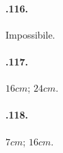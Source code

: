 \begin{multicols}{2}
\paragraph{\thechapter.116.} Impossibile.

\paragraph{\thechapter.117.} $16\unit{cm}$; $24\unit{cm}$.

\paragraph{\thechapter.118.} $7\unit{cm}$; $16\unit{cm}$.
\end{multicols}
